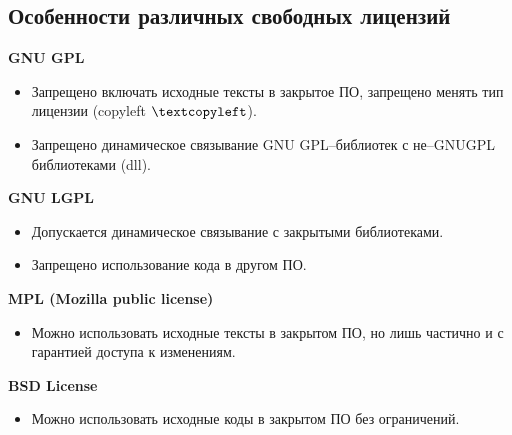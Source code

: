 \subsection{Особенности различных свободных лицензий}
\begin{center}
  \textbf{GNU GPL}
\end{center}
\begin{itemize}
  \item Запрещено включать исходные тексты в закрытое ПО, запрещено менять тип лицензии (copyleft $\textcopyleft$).
  \item Запрещено динамическое связывание GNU GPL--библиотек с не--GNUGPL библиотеками (dll).
\end{itemize}
\begin{center}
  \textbf{GNU LGPL}
\end{center}
\begin{itemize}
  \item Допускается динамическое связывание с закрытыми библиотеками.
  \item Запрещено использование кода в другом ПО.
\end{itemize}
\begin{center}
  \textbf{MPL (Mozilla public license)}
\end{center}
\begin{itemize}
  \item Можно использовать исходные тексты в закрытом ПО, но
лишь частично и с гарантией доступа к изменениям.
\end{itemize}
\begin{center}
  \textbf{BSD License}
\end{center}
\begin{itemize}
  \item Можно использовать исходные коды в закрытом ПО без ограничений.
\end{itemize}

